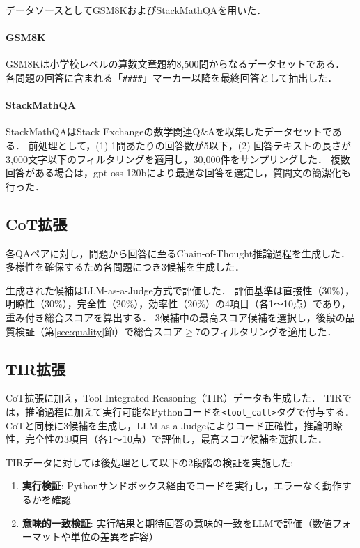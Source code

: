 \documentclass[
  platex, dvipdfmx,  %
]{nlp2026}
\newcommand{\code}[1]{\texttt{#1}}
\begin{document}
データソースとしてGSM8K\cite{gsm8k}およびStackMathQA\cite{stackmathqa}を用いた．

\paragraph{GSM8K}
GSM8Kは小学校レベルの算数文章題約8,500問からなるデータセットである．
各問題の回答に含まれる「\code{\#\#\#\#}」マーカー以降を最終回答として抽出した．

\paragraph{StackMathQA}
StackMathQAはStack Exchangeの数学関連Q\&Aを収集したデータセットである．
前処理として，(1) 1問あたりの回答数が5以下，(2) 回答テキストの長さが3,000文字以下のフィルタリングを適用し，30,000件をサンプリングした．
複数回答がある場合は，gpt-oss-120bにより最適な回答を選定し，質問文の簡潔化も行った．


\subsection{CoT拡張}

各QAペアに対し，問題から回答に至るChain-of-Thought推論過程を生成した．
多様性を確保するため各問題につき3候補を生成した．

生成された候補はLLM-as-a-Judge方式で評価した．
評価基準は直接性（30\%），明瞭性（30\%），完全性（20\%），効率性（20\%）の4項目（各1〜10点）であり，重み付き総合スコアを算出する．
3候補中の最高スコア候補を選択し，後段の品質検証（第\ref{sec:quality}節）で総合スコア$\geq$7のフィルタリングを適用した．

\subsection{TIR拡張}

CoT拡張に加え，Tool-Integrated Reasoning（TIR）データも生成した．
TIRでは，推論過程に加えて実行可能なPythonコードを\code{<tool\_call>}タグで付与する．
CoTと同様に3候補を生成し，LLM-as-a-Judgeによりコード正確性，推論明瞭性，完全性の3項目（各1〜10点）で評価し，最高スコア候補を選択した．

TIRデータに対しては後処理として以下の2段階の検証を実施した:
\begin{enumerate}
\item \textbf{実行検証}: Pythonサンドボックス経由でコードを実行し，エラーなく動作するかを確認
\item \textbf{意味的一致検証}: 実行結果と期待回答の意味的一致をLLMで評価（数値フォーマットや単位の差異を許容）
\end{enumerate}
\end{document}
